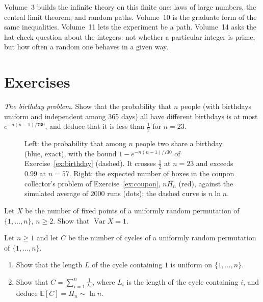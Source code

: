 Volume~3 builds the infinite theory on this finite one: laws of large numbers, the central limit theorem, and random paths. Volume~10 is the graduate form of the same inequalities. Volume~11 lets the experiment be a path. Volume~14 asks the hat-check question about the integers: not whether a particular integer is prime, but how often a random one behaves in a given way.

\section{Exercises}

\begin{exercise}[$\star$]\label{ex:birthday}
\emph{The birthday problem.} Show that the probability that $n$ people (with birthdays uniform and independent among 365 days) all have different birthdays is at most
$e^{-n(n-1)/730}$, and deduce that it is less than $\frac12$ for $n=23$.
\end{exercise}

\begin{figure}[ht]
\centering
{}
\caption{Left: the probability that among $n$ people two share a birthday (blue, exact), with the bound $1-e^{-n(n-1)/730}$ of Exercise~\ref{ex:birthday} (dashed). It crosses $\frac12$ at $n=23$ and exceeds $0.99$ at $n=57$. Right: the expected number of boxes in the coupon collector's problem of Exercise~\ref{ex:coupon}, $nH_n$ (red), against the simulated average of $2000$ runs (dots); the dashed curve is $n\ln n$.}
\label{fig:birthday}
\end{figure}

\begin{exercise}[$\star\star$]\label{ex:fixedvar}
Let $X$ be the number of fixed points of a uniformly random permutation of $\{1,\dots,n\}$, $n\ge2$. Show that $\operatorname{Var}X=1$.
\end{exercise}

\begin{exercise}[$\star\star$]\label{ex:cycles}
Let $n\ge1$ and let $C$ be the number of cycles of a uniformly random permutation of $\{1,\dots,n\}$.
\begin{enumerate}[label=(\alph*)]
\item Show that the length $L$ of the cycle containing $1$ is uniform on $\{1,\dots,n\}$.
\item Show that $C=\sum_{i=1}^n\frac1{L_i}$, where $L_i$ is the length of the cycle containing $i$, and deduce $\mathbb E[C]=H_n\sim\ln n$.
\end{enumerate}
\end{exercise}

